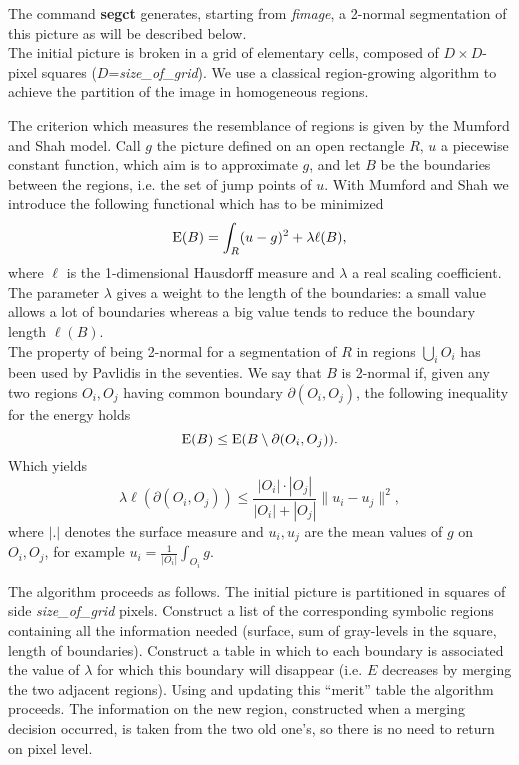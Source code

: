 \def\Disp#1{{\displaystyle #1}}
\def\Dfrac#1#2{{\displaystyle \frac{#1}{#2}}}


The command {\bf segct} generates, starting from {\em fimage}, 
a 2-normal segmentation of this picture as will be described below.\\
The initial picture is broken in a grid of elementary cells, composed of
$D\times D$-pixel squares ($D$={\em size\_of\_grid}). 
We use a classical region-growing algorithm to achieve the partition of the 
image in homogeneous regions.

The criterion which measures the resemblance of regions is given by the 
Mumford and Shah model. Call $g$ the picture defined on an open rectangle $R$,
$u$ a piecewise constant function, which aim is to approximate $g$, and
let $B$ be the boundaries between the regions, i.e. the set of jump points of
$u$. With Mumford and Shah we introduce the following functional which has
to be minimized
$$ {\rm E}(B)=\int_{R} (u-g)^{2} + \lambda\ell(B),$$
where $\ell$ is the 1-dimensional Hausdorff measure and $\lambda$ a real
scaling coefficient. The parameter $\lambda$ gives a weight to the length
of the boundaries: a small value allows a lot of boundaries whereas a big
value tends to reduce the boundary length $\ell(B)$.\\
The property of being 2-normal for a segmentation of $R$ in regions
$\Disp{\bigcup_{i} O_{i}}$ has been used by Pavlidis in the seventies. 
We say that $B$ is 2-normal if, given any two regions $O_{i},O_{j}$ having
common boundary $\partial(O_{i},O_{j})$, the following inequality for
the energy holds 
$$ {\rm E}(B) \leq {\rm E}(B\setminus\partial(O_{i},O_{j})). $$
Which yields
$$ \lambda\ell(\partial(O_{i},O_{j}))\leq\frac{|O_{i}|\cdot |O_{j}|}{|O_{i}|+|O_{j}|}\| u_{i}-u_{j}\| ^{2},$$
where $|.|$ denotes the surface measure and $u_{i},u_{j}$ are the mean values
of $g$ on $O_{i},O_{j}$, for example 
$u_{i}=\Dfrac{1}{|O_{i}|}\Disp{\int_{O_{i}}}g$.

The algorithm proceeds as follows. 
The initial picture is partitioned in squares of side {\em size\_of\_grid}
pixels. 
Construct a list of the corresponding 
symbolic regions containing all the information needed (surface, sum 
of gray-levels in the square, length of boundaries).
Construct a table in which to each boundary is associated the 
value of $\lambda$ for which this boundary will disappear (i.e.
 $E$ decreases by merging the two adjacent regions).
Using and updating this ``merit'' table the algorithm proceeds.
The information on the new region, constructed when a merging decision occurred,
 is taken
from the two old one's, so there is no need to return on pixel level.

